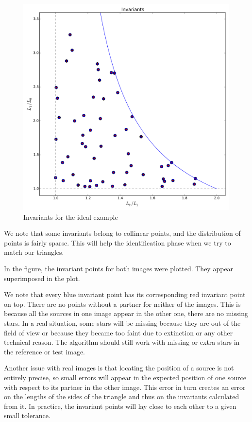 \begin{figure}[htbp]
   \centering
   \includegraphics[width = \linewidth]{chapter_astroalign/figures/idealInvariants.pdf}
   \caption{Invariants for the ideal example}
   \label{fig:ideal_inv}
\end{figure}

We note that some invariants belong to collinear points, and the distribution of points is fairly sparse. 
This will help the identification phase when we try to match our triangles.

In the figure, the invariant points for both images were plotted. They appear superimposed in the plot.

We note that every blue invariant point has its corresponding red invariant point on top. 
There are no points without a partner for neither of the images. 
This is because all the sources in one image appear in the other one, there are no missing stars.
In a real situation, some stars will be missing because they are out of the field of view or because they became too faint due to extinction or any other technical reason. 
The algorithm should still work with missing or extra stars in the reference or test image. 

Another issue with real images is that locating the position of a source is not entirely precise, so small errors will appear in the expected position of one source with respect to its partner in the other image.
This error in turn creates an error on the lengths of the sides of the triangle and thus on the invariants calculated from it.
In practice, the invariant points will lay close to each other to a given small tolerance.


